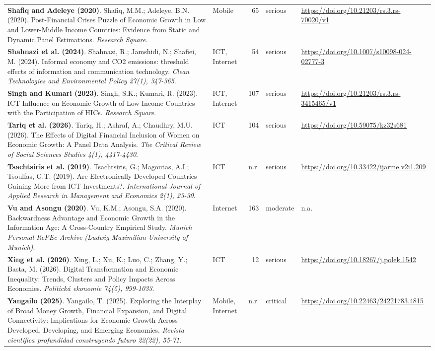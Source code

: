{\begin{longtable}{@{}p{7.4cm} p{1.3cm} r l p{3.4cm}@{}}
\textbf{Shafiq and Adeleye (2020)}. Shafiq, M.M.; Adeleye, B.N. (2020). Post-Financial Crises Puzzle of Economic Growth in Low and Lower-Middle Income Countries: Evidence from Static and Dynamic Panel Estimations. \emph{Research Square}. & Mobile & 65 & serious & \url{https://doi.org/10.21203/rs.3.rs-70020/v1} \\
\textbf{Shahnazi et al. (2024)}. Shahnazi, R.; Jamshidi, N.; Shafiei, M. (2024). Informal economy and CO2 emissions: threshold effects of information and communication technology. \emph{Clean Technologies and Environmental Policy 27(1), 347-365}. & ICT, Internet & 54 & serious & \url{https://doi.org/10.1007/s10098-024-02777-3} \\
\textbf{Singh and Kumari (2023)}. Singh, S.K.; Kumari, R. (2023). ICT Influence on Economic Growth of Low-Income Countries with the Participation of HICs. \emph{Research Square}. & ICT, Internet & 107 & serious & \url{https://doi.org/10.21203/rs.3.rs-3415465/v1} \\
\textbf{Tariq et al. (2026)}. Tariq, H.; Ashraf, A.; Chaudhry, M.U. (2026). The Effects of Digital Financial Inclusion of Women on Economic Growth: A Panel Data Analysis. \emph{The Critical Review of Social Sciences Studies 4(1), 4417-4430}. & ICT & 104 & serious & \url{https://doi.org/10.59075/kz32s681} \\
\textbf{Tsachtsiris et al. (2019)}. Tsachtsiris, G.; Magoutas, A.I.; Tsoulfas, G.T. (2019). Are Electronically Developed Countries Gaining More from ICT Investments?. \emph{International Journal of Applied Research in Management and Economics 2(1), 23-30}. & ICT & n.r. & serious & \url{https://doi.org/10.33422/ijarme.v2i1.209} \\
\textbf{Vu and Asongu (2020)}. Vu, K.M.; Asongu, S.A. (2020). Backwardness Advantage and Economic Growth in the Information Age: A Cross-Country Empirical Study. \emph{Munich Personal RePEc Archive (Ludwig Maximilian University of Munich)}. & Internet & 163 & moderate & n.a. \\
\textbf{Xing et al. (2026)}. Xing, L.; Xu, K.; Luo, C.; Zhang, Y.; Basta, M. (2026). Digital Transformation and Economic Inequality: Trends, Clusters and Policy Impacts Across Economies. \emph{Politická ekonomie 74(5), 999-1033}. & ICT & 12 & serious & \url{https://doi.org/10.18267/j.polek.1542} \\
\textbf{Yangailo (2025)}. Yangailo, T. (2025). Exploring the Interplay of Broad Money Growth, Financial Expansion, and Digital Connectivity: Implications for Economic Growth Across Developed, Developing, and Emerging Economies. \emph{Revista científica profundidad construyendo futuro 22(22), 55-71}. & Mobile, Internet & n.r. & critical & \url{https://doi.org/10.22463/24221783.4815} \\

\end{longtable}}
